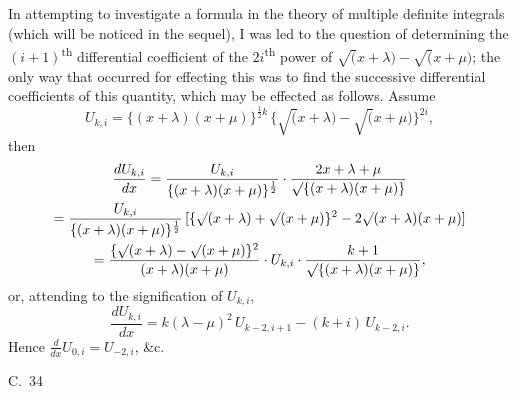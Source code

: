 \documentclass[11pt,a4paper]{book}
\begin{document}
In attempting to investigate a formula in the theory of multiple definite integrals (which will be noticed in the sequel), I was led to the question of determining the $(i+1)$\textsuperscript{th} differential coefficient of the $2i$\textsuperscript{th} power of $\surd(x+\lambda) - \surd(x+\mu)$; the only way that occurred for effecting this was to find the successive differential coefficients of this quantity, which may be effected as follows. Assume
\[
U_{k,i} = \{(x+\lambda)(x+\mu)\}^{\frac{1}{2}k} \, \{\surd(x+\lambda) - \surd(x+\mu)\}^{2i},
\]
then
\begin{multline*}
\frac{dU_{k,i}}{dx} = \frac{U_{k,i}}{\{(x+\lambda)(x+\mu)\}^{\frac{1}{2}}} \cdot \frac{2x+\lambda+\mu}{\surd\{(x+\lambda)(x+\mu)\}} \\
= \frac{U_{k,i}}{\{(x+\lambda)(x+\mu)\}^{\frac{1}{2}}} \, [\{\surd(x+\lambda) + \surd(x+\mu)\}^2 - 2\surd(x+\lambda)(x+\mu)] \\
= \frac{\{\surd(x+\lambda) - \surd(x+\mu)\}^2}{(x+\lambda)(x+\mu)} \cdot U_{k,i} \cdot \frac{k+1}{\surd\{(x+\lambda)(x+\mu)\}},
\end{multline*}
or, attending to the signification of $U_{k,i}$,
\[
\frac{dU_{k,i}}{dx} = k(\lambda-\mu)^2 \, U_{k-2,i+1} - (k+i) \, U_{k-2,i}.
\]
Hence $\frac{d}{dx} U_{0,i} = U_{-2,i}$, \&c.

\vspace{10pt}
\begin{center}
C.~34
\end{center}
\end{document}
